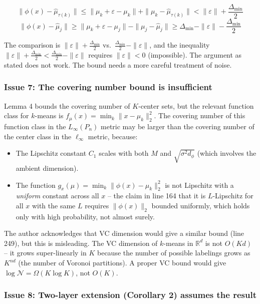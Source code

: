 \documentclass[
  12pt,
]{ctexart}
\providecommand{\tightlist}{%
  \setlength{\itemsep}{0pt}\setlength{\parskip}{0pt}}
\begin{document}
\[\|\phi(x) - \hat{\mu}_{\tau(k)}\| \leq \|\mu_k + \varepsilon - \mu_k\| + \|\mu_k - \hat{\mu}_{\tau(k)}\| < \|\varepsilon\| + \frac{\Delta_{\min}}{2}\]
\[\|\phi(x) - \hat{\mu}_j\| \geq \|\mu_k + \varepsilon - \mu_j\| - \|\mu_j - \hat{\mu}_j\| \geq \Delta_{\min} - \|\varepsilon\| - \frac{\Delta_{\min}}{2}\]

The comparison is \(\|\varepsilon\| + \frac{\Delta_{\min}}{2}\)
vs.~\(\frac{\Delta_{\min}}{2} - \|\varepsilon\|\), and the inequality
\(\|\varepsilon\| + \frac{\Delta_{\min}}{2} < \frac{\Delta_{\min}}{2} - \|\varepsilon\|\)
requires \(\|\varepsilon\| < 0\) (impossible). The argument as stated
does not work. The bound needs a more careful treatment of noise.

\subsubsection{Issue 7: The covering number bound is
insufficient}\label{issue-7-the-covering-number-bound-is-insufficient}

Lemma 4 bounds the covering number of \(K\)-center sets, but the
relevant function class for \(k\)-means is
\(f_\mu(x) = \min_k \|x - \mu_k\|_2^2\). The covering number of this
function class in the \(L_\infty(P_n)\) metric may be larger than the
covering number of the center class in the \(\ell_\infty\) metric,
because:

\begin{itemize}
\tightlist
\item
  The Lipschitz constant \(C_1\) scales with both \(M\) and
  \(\sqrt{\sigma^2 d_\phi}\) (which involves the ambient dimension).
\item
  The function \(g_x(\mu) = \min_k \|\phi(x) - \mu_k\|_2^2\) is not
  Lipschitz with a \emph{uniform} constant across all \(x\) -- the claim
  in line 164 that it is \(L\)-Lipschitz for all \(x\) with the same
  \(L\) requires \(\|\phi(x)\|_2\) bounded uniformly, which holds only
  with high probability, not almost surely.
\end{itemize}

The author acknowledges that VC dimension would give a similar bound
(line 249), but this is misleading. The VC dimension of \(k\)-means in
\(\mathbb{R}^d\) is not \(O(Kd)\) -- it grows super-linearly in \(K\)
because the number of possible labelings grows as \(K^{nd}\) (the number
of Voronoi partitions). A proper VC bound would give
\(\log \mathcal{N} = \Omega(K \log K)\), not \(O(K)\).

\subsubsection{Issue 8: Two-layer extension (Corollary 2) assumes the
result}\label{issue-8-two-layer-extension-corollary-2-assumes-the-result}
\end{document}
